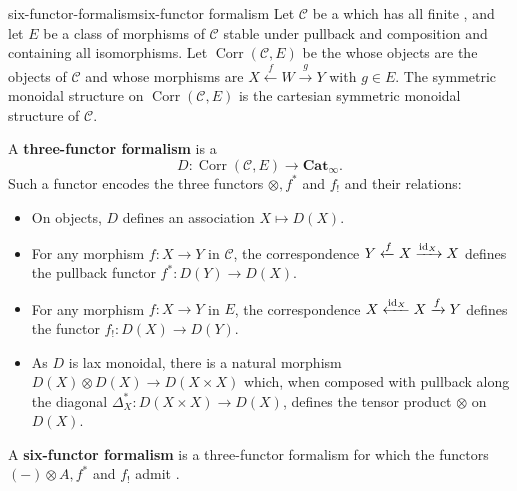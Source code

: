 \begin{topic}{six-functor-formalism}{six-functor formalism}
    Let $\mathcal{C}$ be a  which has all finite , and let $E$ be a class of morphisms of $\mathcal{C}$ stable under pullback and composition and containing all isomorphisms.
    Let $\operatorname{Corr}(\mathcal{C}, E)$ be the   whose objects are the objects of $\mathcal{C}$ and whose morphisms are  $X \xleftarrow{f} W \xrightarrow{g} Y$ with $g \in E$. The symmetric monoidal structure on $\operatorname{Corr}(\mathcal{C}, E)$ is the cartesian symmetric monoidal structure of $\mathcal{C}$.

    A \textbf{three-functor formalism} is a 
    \[ D : \operatorname{Corr}(\mathcal{C}, E) \to \textbf{Cat}_\infty . \]
    Such a functor encodes the three functors $\otimes, f^*$ and $f_!$ and their relations:
    \begin{itemize}
        \item On objects, $D$ defines an association $X \mapsto D(X)$.
        \item For any morphism $f : X \to Y$ in $\mathcal{C}$, the correspondence $Y \xleftarrow{f} X \xrightarrow{\textup{id}_X} X$ defines the pullback functor $f^* : D(Y) \to D(X)$.
        \item For any morphism $f : X \to Y$ in $E$, the correspondence $X \xleftarrow{\textup{id}_X} X \xrightarrow{f} Y$ defines the functor $f_! : D(X) \to D(Y)$.
        \item As $D$ is lax monoidal, there is a natural morphism $D(X) \otimes D(X) \to D(X \times X)$ which, when composed with pullback along the diagonal $\Delta_X^* : D(X \times X) \to D(X)$, defines the tensor product $\otimes$ on $D(X)$.
    \end{itemize}
    A \textbf{six-functor formalism} is a three-functor formalism for which the functors $(-) \otimes A, f^*$ and $f_!$ admit .
\end{topic}

